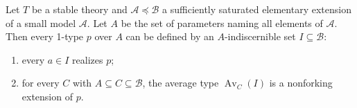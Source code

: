 Let $T$ be a stable theory and $\mathcal{A} \preceq \mathcal{B}$ a sufficiently saturated elementary extension of a small model $\mathcal{A}$. Let $A$ be the set of parameters naming all elements of $\mathcal{A}$. Then every 1-type $p$ over $A$ can be defined by an $A$-indiscernible set $I \subseteq \mathcal{B}$:

\begin{enumerate}
\item[(i)] every $a \in I$ realizes $p$;
\item[(ii)] for every $C$ with $A \subseteq C \subseteq \mathcal{B}$, the average type $\operatorname{Av}_C(I)$ is a nonforking extension of $p$.
\end{enumerate}
